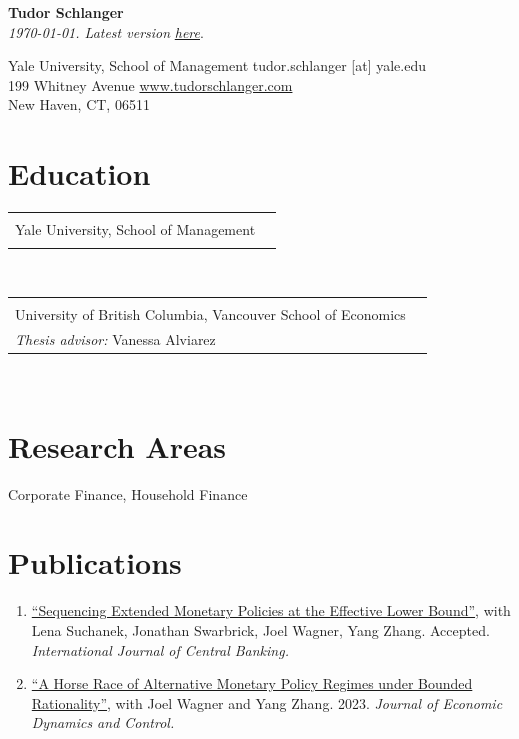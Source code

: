 \documentclass[letterpaper,10pt]{article}
\newcommand{\educItem}[4]{
		\vspace{0.2em} 	\begin{tabular*}{0.99\textwidth}[t]{lp{\labelsep}}
	      \eqparbox[t]{dates}{\ \ \ \ #1 \ \ \ \ } & \eqparbox[t]{educList}{\textbf{#2} \\ #3 \\ #4}
	   \end{tabular*} \vspace{0.2em} \\
		}
\newcommand{\pubSubHeadingListStart}{\begin{enumerate}[leftmargin=1em]}
\newcommand{\pubSubHeadingListEnd}{\end{enumerate}\vspace{-5pt}}
\newcommand{\pubItem}[3]{
	  \item{
	    \href{#1}{``#2''}{, with #3 \vspace{-2pt}}
	  }
	}
\begin{document}

\begin{center}
    \textbf{\Large  Tudor Schlanger} \\
    \textit{\today. Latest version} \href{https://raw.githubusercontent.com/tudorschlanger/cv/main/cv.pdf}{\textit{here}}.
\end{center}

Yale University, School of Management \hfill tudor.schlanger [at] yale.edu\\
199 Whitney Avenue   			  \hfill \href{https://www.tudorschlanger.com}{www.tudorschlanger.com} \\
New Haven, CT, 06511				  \hfill  


\section{Education}
\educItem{2023-Present}{Ph.D Student in Financial Economics}{Yale University, School of Management}{} 
\educItem{2019}{B.A in International Economics}{University of British Columbia, Vancouver School of Economics}{\textit{Thesis advisor:} Vanessa Alviarez} 

\section{Research Areas}

\hspace{1em} Corporate Finance, Household Finance



\section{Publications}

\pubSubHeadingListStart
	\pubItem{https://www.bankofcanada.ca/wp-content/uploads/2021/07/sdp2021-10.pdf}{Sequencing Extended Monetary Policies at the Effective Lower Bound}{Lena Suchanek, Jonathan Swarbrick, Joel Wagner, Yang Zhang. Accepted. \textit{International Journal of Central Banking.}}
	\pubItem{https://www.dropbox.com/scl/fi/j163cbxanc4ij4jcdauxt/draft_paper_20230724_prepublish.pdf?rlkey=zgvazmtdvw3xdgurn0ry6qykb&e=1&dl=0}{A Horse Race of Alternative Monetary Policy Regimes under Bounded Rationality}{Joel Wagner and Yang Zhang. 2023. \textit{Journal of Economic Dynamics and Control. }}
\pubSubHeadingListEnd
\end{document}
